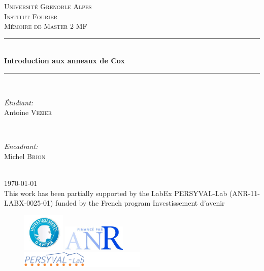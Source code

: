 \documentclass[oneside, 10pt]{book}
\begin{document}
\begin{titlepage}

\newcommand{\HRule}{\rule{\linewidth}{0.5mm}} %

\center

\textsc{\LARGE Université Grenoble Alpes}\\[0.5cm] 
\textsc{\large Institut Fourier}\\[1.5cm] 

\textsc{\Large Mémoire de Master 2 MF}\\[2.5cm] 

\HRule \\[0.4cm]
{ \huge \bfseries Introduction aux anneaux de Cox}\\[0.4cm] 
\HRule \\[1.5cm]

\begin{minipage}{0.4\textwidth}
\begin{flushleft} \large
\emph{Étudiant:}\\
Antoine \textsc{Vezier} 
\end{flushleft}
\end{minipage}
~
\begin{minipage}{0.4\textwidth}
\begin{flushright} \large
\emph{Encadrant:} \\
Michel \textsc{Brion} 
\end{flushright}
\end{minipage}\\[2cm]



{\large \today}\\[5cm] 


{\large This work has been partially supported by the LabEx PERSYVAL-Lab (ANR-11-LABX-0025-01) funded by the French program Investissement d’avenir
}

\begin{figure}[!htb]
   \begin{minipage}{0.3\textwidth}
     \centering
     \includegraphics[width=20mm]{investissement-avenir.jpg}
   \end{minipage}
   \begin{minipage}{0.35\textwidth}
     \centering
          \includegraphics[width=30mm]{ANRfinance.jpg}
   \end{minipage}
   \begin{minipage}{0.3\textwidth}
        \includegraphics[width=60mm]{PERSYVAL.png}
     \centering
   \end{minipage}
\end{figure}


\end{titlepage}
\end{document}
